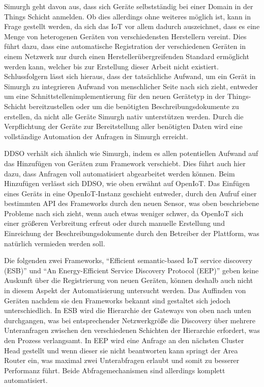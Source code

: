 \documentclass[conference,compsoc]{IEEEtran}
\begin{document}
Simurgh geht davon aus, dass sich Geräte selbstständig bei einer Domain in der Things Schicht anmelden. Ob dies allerdings ohne weiteres möglich ist, kann in Frage gestellt werden, da sich das IoT vor allem dadurch auszeichnet, dass es eine Menge von heterogenen Geräten von verschiedensten Herstellern vereint. Dies führt dazu, dass eine automatische Registration der verschiedenen Geräten in einem Netzwerk nur durch einen Herstellerübergreifenden Standard ermöglicht werden kann, welcher bis zur Erstellung dieser Arbeit nicht existiert. Schlussfolgern lässt sich hieraus, dass der tatsächliche Aufwand, um ein Gerät in Simurgh zu integrieren Aufwand von menschlicher Seite nach sich zieht, entweder um eine Schnittstellenimplementierung für den neuen Gerätetyp in der Things-Schicht bereitzustellen oder um die benötigten Beschreibungsdokumente zu erstellen, da nicht alle Geräte Simurgh nativ unterstützen werden. Durch die Verpflichtung der Geräte zur Bereitstellung aller benötigten Daten wird eine vollständige Automation der Anfragen in Simurgh erreicht.

DDSO verhält sich ähnlich wie Simurgh, indem es allen potentiellen Aufwand auf das Hinzufügen von Geräten zum Framework verschiebt. Dies führt auch hier dazu, dass Anfragen voll automatisiert abgearbeitet werden können. Beim Hinzufügen verlässt sich DDSO, wie oben erwähnt auf OpenIoT. Das Einfügen eines Geräts in eine OpenIoT-Instanz geschieht entweder, durch den Aufruf einer bestimmten API des Frameworks durch den neuen Sensor, was oben beschriebene Probleme nach sich zieht, wenn auch etwas weniger schwer, da OpenIoT sich einer größeren Verbreitung erfreut oder durch manuelle Erstellung und Einreichung der Beschreibungsdokumente durch den Betreiber der Plattform, was natürlich vermieden werden soll.

Die folgenden zwei Frameworks, \enquote{Efficient semantic-based IoT service discovery (ESB)} und \enquote{An Energy-Efficient Service Discovery Protocol (EEP)} geben keine Auskunft über die Registrierung von neuen Geräten, können deshalb auch nicht in diesem Aspekt der Automatisierung untersucht werden. Das Auffinden von Geräten nachdem sie den Frameworks bekannt sind gestaltet sich jedoch unterschiedlich. In ESB wird die Hierarchie der Gateways von oben nach unten durchgangen, was bei entsprechender Netzwerkgröße die Discovery über mehrere Unteranfragen zwischen den verschiedenen Schichten der Hierarchie erfordert, was den Prozess verlangsamt. In EEP wird eine Anfrage an den nächsten Cluster Head gestellt und wenn dieser sie nicht beantworten kann springt der Area Router ein, was maximal zwei Unterabfragen erlaubt und somit zu besserer Performanz führt. Beide Abfragemechanismen sind allerdings komplett automatisiert.
\end{document}

